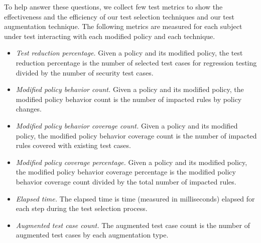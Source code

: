 To help answer these questions, we collect few test metrics to show the effectiveness and the efficiency of our test selection techniques and
our test augmentation technique. 
The following metrics are
measured for each subject under test interacting with each modified policy
and each technique.
\begin{itemize}
	\item \textit{Test reduction percentage.}  Given a policy and its modified
	policy, the test reduction percentage is the number of selected test cases for regression testing divided by the number of security test cases.
		\item \textit{Modified policy behavior count.}  Given a policy and its modified
	policy, the modified policy behavior count is the number of impacted rules by policy changes.
	\item \textit{Modified policy behavior coverage count.}  Given a policy and its modified
	policy, the modified policy behavior coverage count is the number of
	impacted rules covered with existing test cases.
	\item \textit{Modified policy coverage percentage.}  Given a policy and its modified
	policy, the modified policy behavior coverage percentage is the modified policy behavior coverage count divided by the total number of impacted rules.
	\item \textit{Elapsed time.}  The elapsed time is time (measured in milliseconds) elapsed for each step during the test selection process.
	\item \textit{Augmented test case count.}  The augmented test case count is the number of augmented test cases by each augmentation type.
	
\end{itemize}
 
%

